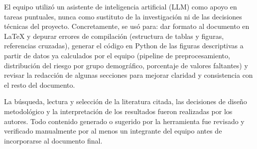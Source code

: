 \documentclass[conference]{IEEEtran}
\begin{document}
El equipo utilizó un asistente de inteligencia artificial (LLM) como apoyo en tareas puntuales, nunca como sustituto de la investigación ni de las decisiones técnicas del proyecto. Concretamente, se usó para: dar formato al documento en LaTeX y depurar errores de compilación (estructura de tablas y figuras, referencias cruzadas), generar el código en Python de las figuras descriptivas a partir de datos ya calculados por el equipo (pipeline de preprocesamiento, distribución del riesgo por grupo demográfico, porcentaje de valores faltantes) y revisar la redacción de algunas secciones para mejorar claridad y consistencia con el resto del documento.

La búsqueda, lectura y selección de la literatura citada, las decisiones de diseño metodológico y la interpretación de los resultados fueron realizadas por los autores. Todo contenido generado o sugerido por la herramienta fue revisado y verificado manualmente por al menos un integrante del equipo antes de incorporarse al documento final.



\end{document}
